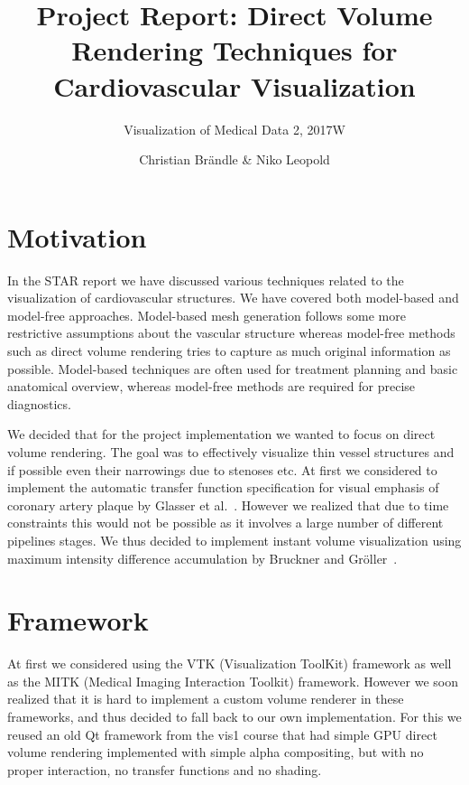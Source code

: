 \documentclass[english, paper=a4]{scrartcl}
\begin{document}
\graphicspath{{images/}}


\title{Project Report: Direct Volume Rendering Techniques for Cardiovascular Visualization } 
\subtitle{Visualization of Medical Data 2, 2017W} 
\author{Christian Br{\"a}ndle \& Niko Leopold}

\maketitle


\section{Motivation}

In the STAR report we have discussed various techniques related to the visualization of cardiovascular structures. We have covered both model-based and model-free approaches. Model-based mesh generation follows some more restrictive assumptions about the vascular structure whereas model-free methods such as direct volume rendering tries to capture as much original information as possible. Model-based techniques are often used for treatment planning and basic anatomical overview, whereas model-free methods are required for precise diagnostics.

We decided that for the project implementation we wanted to focus on direct volume rendering. The goal was to effectively visualize thin vessel structures and if possible even their narrowings due to stenoses etc. At first we considered to implement the automatic transfer function specification for visual emphasis of coronary artery plaque by Glasser et al.~\cite{glasser2010automatic}. However we realized that due to time constraints this would not be possible as it involves a large number of different pipelines stages. We thus decided to implement instant volume visualization using maximum intensity difference accumulation by Bruckner and Gr{\"o}ller~\cite{bruckner2009instant}.

\section{Framework}

At first we considered using the VTK (Visualization ToolKit) framework as well as the MITK (Medical Imaging Interaction Toolkit) framework. However we soon realized that it is hard to implement a custom volume renderer in these frameworks, and thus decided to fall back to our own implementation. For this we reused an old Qt framework from the vis1 course that had simple GPU direct volume rendering implemented with simple alpha compositing, but with no proper interaction, no transfer functions and no shading.
\end{document}
